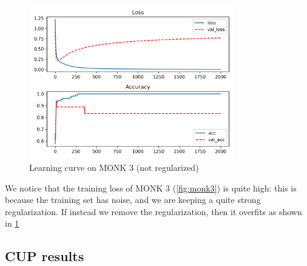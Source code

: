 \begin{figure}
    \caption{Learning curve on MONK 3 (not regularized)}
    \label{fig:monk3-nr}
    \begin{center}
        \includegraphics[width=0.8\textwidth]{monks3-nr}
    \end{center}
\end{figure}


We notice that the training loss of MONK 3 (\cref{fig:monk3}) is quite high: this is because the training set has noise, and we are keeping a quite strong regularization.
If instead we remove the regularization, then it overfits as shown in \cref{fig:monk3-nr}

\subsection{CUP results}


